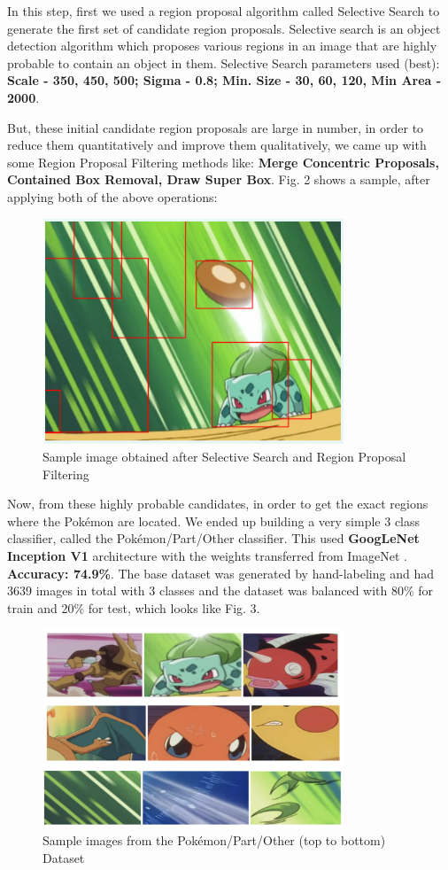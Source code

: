 \documentclass[journal, a4paper]{IEEEtran}
\begin{document}
In this step, first we used a region proposal algorithm called Selective Search\cite{SELECTIVE SEARCH} \cite{SELECTIVE SEARCH CODE} to generate the first set of candidate region proposals. Selective search is an object detection algorithm which proposes various regions in an image that are highly probable to contain an object in them. Selective Search parameters used (best): \textbf{Scale - 350, 450, 500; Sigma - 0.8; Min. Size - 30, 60, 120, Min Area - 2000}.

But, these initial candidate region proposals are large in number, in order to reduce them quantitatively and improve them qualitatively, we came up with some Region Proposal Filtering methods like: \textbf{Merge Concentric Proposals, Contained Box Removal, Draw Super Box}. Fig. 2 shows a sample, after applying both of the above operations:

 \begin{figure}[ht]
    \caption{Sample image obtained after Selective Search and Region Proposal Filtering}
\centering
 \includegraphics[scale = 0.3, width=9cm]{ppo.png}
    \end{figure}

Now, from these highly probable candidates, in order to get the exact regions where the Pok\'emon are located. We ended up building a very simple 3 class classifier, called the Pok\'emon/Part/Other classifier. This used \textbf{GoogLeNet Inception V1} \cite{googlenet} architecture with the weights transferred from ImageNet \cite{IMAGENET}. \textbf{Accuracy: 74.9\%}. The base dataset was generated by hand-labeling and had 3639 images in total with 3 classes and the dataset was balanced with 80\% for train and 20\% for test, which looks like Fig. 3.

\begin{figure}[ht]
    \caption{Sample images from the Pok\'emon/Part/Other (top to bottom) Dataset}
\centering
 \includegraphics[scale = 0.6, width=9cm]{ppo1.png}
    \end{figure}
\end{document}
